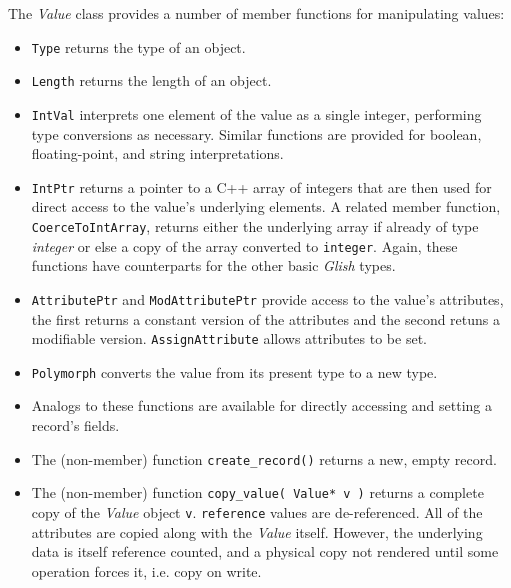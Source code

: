 The {\em Value} class provides a number of member functions
for manipulating values:
\begin{itemize}

\item {\tt Type}
returns the type of an object.

\item {\tt Length}
returns the length of an object.

\item {\tt IntVal}
interprets one element of the
value as a single integer, performing type conversions as necessary.
Similar functions are provided for boolean, floating-point, and string
interpretations.

\item {\tt IntPtr}
returns a pointer to a C++ array of integers
that are then used for direct access to the value's underlying elements.
A related member function,
{\tt CoerceToIntArray}, returns either the underlying array if already
of type {\em integer} or else a copy of the array converted to {\tt integer}.
Again, these functions have counterparts for the other basic {\em Glish} types.

\item {\tt AttributePtr}
and {\tt ModAttributePtr} provide access to the value's attributes, the first
returns a constant version of the attributes and the second retuns a modifiable
version. {\tt AssignAttribute}
allows attributes to be set.

\item {\tt Polymorph}
converts the value from its present type to a new type.

\item Analogs to these functions are available for directly
accessing and setting a record's fields.

\item The
(non-member) function {\tt create\_record()} returns a new,
empty record.

\item The
(non-member) function {\tt copy\_value( Value* v )} returns a
complete copy of the {\em Value} object {\tt v}. {\tt reference} values
are de-referenced. All of the attributes are copied along with the {\em Value}
itself. However, the underlying data is itself reference counted, and a
physical copy not rendered until some operation forces it, i.e. copy on write.

\end{itemize}

